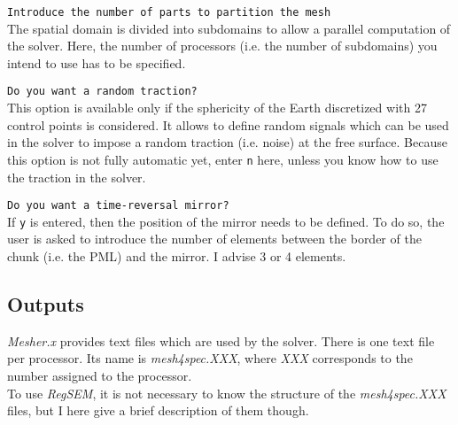\texttt{Introduce the number of parts to partition the mesh}\\
The spatial domain is divided into subdomains to allow a parallel computation of the solver. Here,
the number of processors (i.e. the number of subdomains) you intend to use has to be specified.

\texttt{Do you want a random traction?}\\
This option is available only if the sphericity of the Earth discretized with 27 control points is considered. It allows to define random signals which can be used in the solver to impose a random traction (i.e. noise) at the free surface. Because this option is not fully automatic yet, enter \texttt{n} here, unless you know how to use the traction in the solver.

\texttt{Do you want a time-reversal mirror?}\\
If \texttt{y} is entered, then the position of the mirror needs to be defined. To do so, the user is asked to introduce the number of elements between the border of the chunk (i.e. the PML) and the mirror. I advise 3 or 4 elements.



\subsection{Outputs}
\label{mesh4spec}

\textit{Mesher.x} provides text files which are used by the solver. There is one text file per
processor. Its name is \textit{mesh4spec.XXX}, where \textit{XXX} corresponds to the number assigned
to the processor.\\
To use \textit{RegSEM}, it is not necessary to know the structure of the \textit{mesh4spec.XXX}
files, but I here give a brief description of them though.


